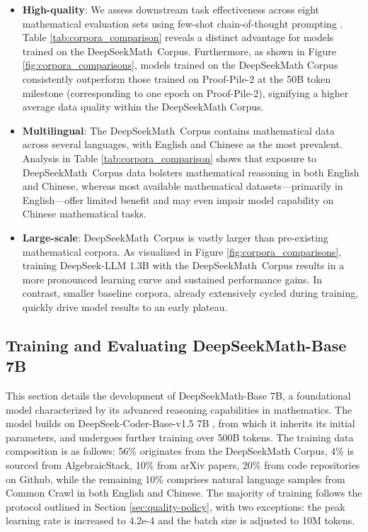 \begin{itemize}[topsep=0pt]
    \item \textbf{High-quality}:
    We assess downstream task effectiveness across eight mathematical evaluation sets using few-shot chain-of-thought prompting \cite{cot}. Table \ref{tab:corpora_comparison} reveals a distinct advantage for models trained on the DeepSeekMath~Corpus. Furthermore, as shown in Figure \ref{fig:corpora_comparisons}, models trained on the DeepSeekMath Corpus consistently outperform those trained on Proof-Pile-2 at the 50B token milestone (corresponding to one epoch on Proof-Pile-2), signifying a higher average data quality within the DeepSeekMath Corpus.
    \item \textbf{Multilingual}:
    The DeepSeekMath~Corpus contains mathematical data across several languages, with English and Chinese as the most prevalent. Analysis in Table \ref{tab:corpora_comparison} shows that exposure to DeepSeekMath~Corpus data bolsters mathematical reasoning in both English and Chinese, whereas most available mathematical datasets—primarily in English—offer limited benefit and may even impair model capability on Chinese mathematical tasks.
    \item \textbf{Large-scale}:
    DeepSeekMath~Corpus is vastly larger than pre-existing mathematical corpora. As visualized in Figure \ref{fig:corpora_comparisons}, training DeepSeek-LLM 1.3B with the DeepSeekMath~Corpus results in a more pronounced learning curve and sustained performance gains. In contrast, smaller baseline corpora, already extensively cycled during training, quickly drive model results to an early plateau.
\end{itemize}

\subsection{Training and Evaluating DeepSeekMath-Base 7B}

This section details the development of DeepSeekMath-Base 7B, a foundational model characterized by its advanced reasoning capabilities in mathematics. The model builds on DeepSeek-Coder-Base-v1.5 7B \citep{deepseek-coder}, from which it inherits its initial parameters, and undergoes further training over 500B tokens. The training data composition is as follows: 56\% originates from the DeepSeekMath Corpus, 4\% is sourced from AlgebraicStack, 10\% from arXiv papers, 20\% from code repositories on Github, while the remaining 10\% comprises natural language samples from Common Crawl in both English and Chinese. The majority of training follows the protocol outlined in Section \ref{sec:quality-policy}, with two exceptions: the peak learning rate is increased to 4.2e-4 and the batch size is adjusted to 10M tokens.

